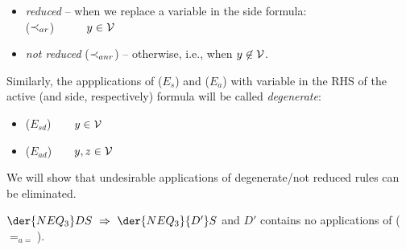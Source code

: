 \begin{DEFINITION}
\begin{itemize}\MyLPar
\item  {\em reduced} -- when we replace a variable in the side formula:\\
 ($\mathbin{\prec}_{ar}$)\ \ 
\label{ru:ar}\ \ \  $y\in {\cal V}$
\item {\em not reduced} ($\mathbin{\prec}_{anr}$) -- otherwise, i.e.,  when
$y\not\in{\cal V}$. 
\end{itemize}
Similarly, the appplications of ($E_s$) and ($E_a$) with variable in the RHS
of the active (and side, respectively) formula will be
called {\em degenerate}:
\begin{itemize}\MyLPar
\item ($E_{sd}$)\ \ \ \
 $y\in{\cal V}$
\item ($E_{ad}$)\ \ \prule{\Gamma,x\Incl z, y\Incl x,\Seq\Delta}{\Gamma,
y\Incl z,\Seq\Delta}\ \
 $y, z\in{\cal V}$
\end{itemize}
\end{DEFINITION}
\noindent
We will show that undesirable applications of degenerate/not reduced rules
can be eliminated.
\begin{LEMMA}\label{le:noeqeq}
 $\der{NEQ_3}DS\ \impl\ \der{NEQ_3}{D'}S$ and $D'$ contains no applications
 of ($=_{a=}$).
\end{LEMMA}
